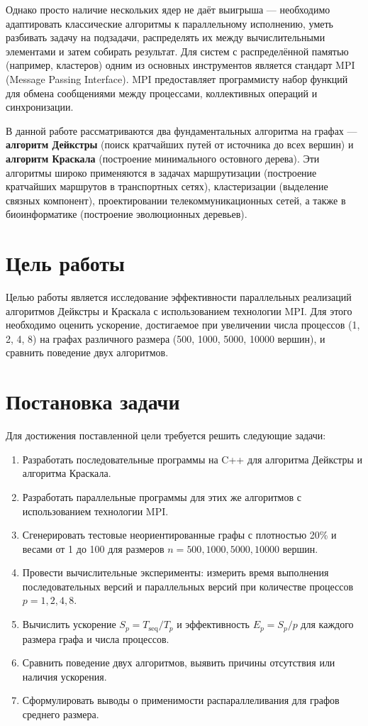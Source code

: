 \documentclass[14pt,a4paper]{article}
\begin{document}
Однако просто наличие нескольких ядер не даёт выигрыша — необходимо адаптировать классические алгоритмы к параллельному исполнению, уметь разбивать задачу на подзадачи, распределять их между вычислительными элементами и затем собирать результат. Для систем с распределённой памятью (например, кластеров) одним из основных инструментов является стандарт MPI (Message Passing Interface). MPI предоставляет программисту набор функций для обмена сообщениями между процессами, коллективных операций и синхронизации.

В данной работе рассматриваются два фундаментальных алгоритма на графах — \textbf{алгоритм Дейкстры} (поиск кратчайших путей от источника до всех вершин) и \textbf{алгоритм Краскала} (построение минимального остовного дерева). Эти алгоритмы широко применяются в задачах маршрутизации (построение кратчайших маршрутов в транспортных сетях), кластеризации (выделение связных компонент), проектировании телекоммуникационных сетей, а также в биоинформатике (построение эволюционных деревьев).

\section{Цель работы}
Целью работы является исследование эффективности параллельных реализаций алгоритмов Дейкстры и Краскала с использованием технологии MPI. Для этого необходимо оценить ускорение, достигаемое при увеличении числа процессов (1, 2, 4, 8) на графах различного размера (500, 1000, 5000, 10000 вершин), и сравнить поведение двух алгоритмов.

\section{Постановка задачи}
Для достижения поставленной цели требуется решить следующие задачи:
\begin{enumerate}
    \item Разработать последовательные программы на C++ для алгоритма Дейкстры и алгоритма Краскала.
    \item Разработать параллельные программы для этих же алгоритмов с использованием технологии MPI.
    \item Сгенерировать тестовые неориентированные графы с плотностью 20\% и весами от 1 до 100 для размеров $n = 500, 1000, 5000, 10000$ вершин.
    \item Провести вычислительные эксперименты: измерить время выполнения последовательных версий и параллельных версий при количестве процессов $p = 1, 2, 4, 8$.
    \item Вычислить ускорение $S_p = T_{\text{seq}} / T_p$ и эффективность $E_p = S_p / p$ для каждого размера графа и числа процессов.
    \item Сравнить поведение двух алгоритмов, выявить причины отсутствия или наличия ускорения.
    \item Сформулировать выводы о применимости распараллеливания для графов среднего размера.
\end{enumerate}
\end{document}
